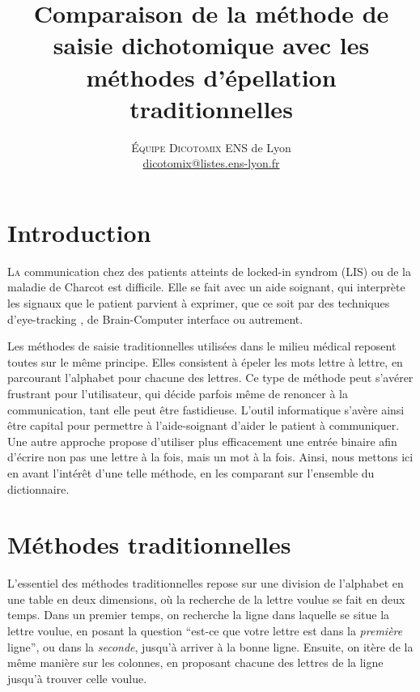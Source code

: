 \documentclass[twoside,twocolumn]{article}
\title{Comparaison de la méthode de saisie dichotomique avec les méthodes d'épellation traditionnelles} %
\author{%
\textsc{Équipe Dicotomix}
\normalsize ENS de Lyon \\ %
\normalsize \href{mailto:dicotomix@listes.ens-lyon.fr}{dicotomix@listes.ens-lyon.fr} %
}
\date{} %
\begin{document}
\maketitle


\section{Introduction}

\lettrine[nindent=0em,lines=3]{L}a communication chez des patients atteints de locked-in syndrom (LIS) ou de la maladie de Charcot est difficile. Elle se fait avec un aide soignant, qui interprète les signaux que le patient parvient à exprimer, que ce soit par des techniques d'eye-tracking \cite{eyetracking}, de Brain-Computer interface \cite{bci} \cite{bloodbci} ou autrement. \cite{methods}

Les méthodes de saisie traditionnelles utilisées dans le milieu médical reposent toutes sur le même principe. \cite{anxiete} Elles consistent à épeler les mots lettre à lettre, en parcourant l'alphabet pour chacune des lettres. Ce type de méthode peut s'avérer frustrant \cite{anxiete} pour l'utilisateur, qui décide parfois même de renoncer à la communication, tant elle peut être fastidieuse. L'outil informatique s'avère ainsi être capital \cite{haristoy} pour permettre à l'aide-soignant d'aider le patient à communiquer. Une autre approche propose d'utiliser plus efficacement une entrée binaire afin d'écrire non pas une lettre à la fois, mais un mot à la fois. Ainsi, nous mettons ici en avant l'intérêt d'une telle méthode, en les comparant sur l'ensemble du dictionnaire.


\section{Méthodes traditionnelles}

L'essentiel des méthodes traditionnelles repose sur une division de l'alphabet en une table en deux dimensions, où la recherche de la lettre voulue se fait en deux temps. \cite{codes} Dans un premier temps, on recherche la ligne dans laquelle se situe la lettre voulue, en posant la question ``est-ce que votre lettre est dans la \textit{première} ligne'', ou dans la \textit{seconde}, jusqu'à arriver à la bonne ligne. Ensuite, on itère de la même manière sur les colonnes, en proposant chacune des lettres de la ligne jusqu'à trouver celle voulue.
\end{document}

